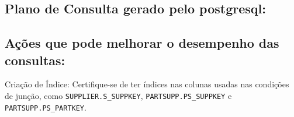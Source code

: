 \documentclass[12pt]{article}
\begin{document}
\begin{landscape}
\subsection{Plano de Consulta gerado pelo postgresql:}

\subsection{Ações que pode melhorar o desempenho das 
consultas:} Criação de Índice: Certifique-se de ter índices nas colunas usadas nas condições de junção, como \texttt{SUPPLIER.S\_SUPPKEY}, \texttt{PARTSUPP.PS\_SUPPKEY} e \texttt{PARTSUPP.PS\_PARTKEY}.

\end{landscape}
\end{document}
